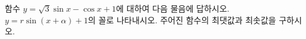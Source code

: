함수 $y=\sqrt{3}\sin x-\cos x+1$에 대하여 다음 물음에 \mbox{답하시오.}
 $y=r\sin(x+\alpha)+1$의 꼴로 나타내시오. 
 주어진 함수의 최댓값과 최솟값을 구하시오.
